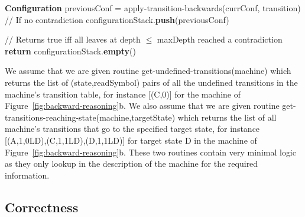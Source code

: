 \begin{algorithm}
\begin{algorithmic}[1]
          \State \textbf{Configuration} previousConf = {\sc apply-transition-backwards}(currConf, transition)
          \State // If no contradiction
          \State configurationStack.\textbf{push}(previousConf)
          \EndIf
          \EndFor
          \EndWhile

          \State // Returns true iff all leaves at depth $\leq$ maxDepth reached a contradiction
          \State \textbf{return} configurationStack.\textbf{empty}()
          \EndProcedure

  \end{algorithmic}
\end{algorithm}

We assume that we are given routine {\sc get-undefined-transitions}(machine) which returns the list of (state,readSymbol) pairs of all the undefined transitions in the machine's transition table, for instance [(\textcolor{colorC}{C},0)] for the machine of Figure~\ref{fig:backward-reasoning}b. We also assume that we are given routine {\sc get-transitions-reaching-state}(machine,targetState) which returns the list of all machine's transitions that go to the specified target state, for instance [(\textcolor{colorA}{A},1,0LD),(\textcolor{colorC}{C},1,1LD),(D,1,1LD)] for target state D in the machine of Figure~\ref{fig:backward-reasoning}b. These two routines contain very minimal logic as they only lookup in the description of the machine for the required information.

\subsection{Correctness}

